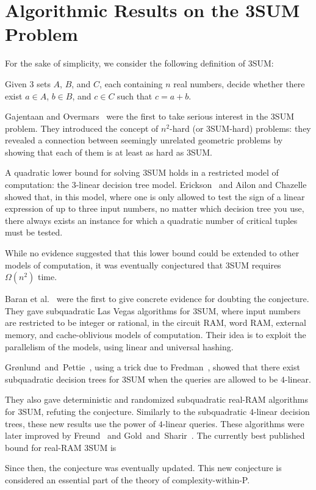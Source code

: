 \section{Algorithmic Results on the 3SUM Problem}
For the sake of simplicity, we consider the following definition of 3SUM\@:
\begin{problem}[3SUM]
Given 3 sets $A$, $B$, and $C$, each containing $n$ real numbers, decide
whether there exist $a \in A$, $b \in B$, and $c \in C$ such that $c=a+b$.
\end{problem}

Gajentaan and Overmars~\cite{GO95} were the first to take serious interest in
the 3SUM problem. They introduced the concept of \(n^2\)-hard (or
3SUM-hard) problems:
they revealed a connection between seemingly unrelated geometric
problems by showing that each of them is at least as hard as 3SUM.

A quadratic lower bound for solving 3SUM holds in a restricted model of
computation: the $3$-linear decision tree model. Erickson~\cite{Er99}
and Ailon and Chazelle~\cite{AC05} showed
that, in this model, where one is only allowed to test the sign of a linear
expression of up to three input numbers, no matter which decision tree you
use, there always exists an instance for which a quadratic number of
critical tuples must be tested.


While no evidence suggested that this lower bound could be extended to other
models of computation, it was eventually conjectured that 3SUM requires
$\Omega(n^2)$ time.

Baran et al.~\cite{BDP08} were the first to give concrete evidence
for doubting the conjecture.
They gave subquadratic Las Vegas algorithms for 3SUM, where input
numbers are restricted to be integer or rational, in the circuit RAM,
word RAM, external memory, and cache-oblivious models of computation. Their idea
is to exploit the parallelism of the models, using linear and
universal hashing.

Gr\o nlund~and~Pettie~\cite{GP14}, using a trick due to Fredman~\cite{Fr76},
showed that there exist subquadratic decision trees for 3SUM when the queries
are allowed to be $4$-linear.

They also gave deterministic and randomized
subquadratic real-RAM algorithms for 3SUM, refuting the conjecture.
Similarly to the subquadratic $4$-linear decision trees, these new results
use the power of $4$-linear queries.
%
These algorithms were later improved by Freund~\cite{Fr15} and
Gold~and~Sharir~\cite{GS15}.
The currently best published bound for real-RAM 3SUM is

Since then, the conjecture was eventually updated. This new conjecture is
considered an essential part of the theory of complexity-within-P.


